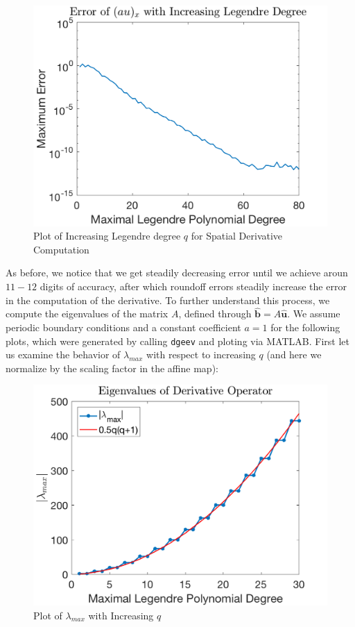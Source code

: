 \documentclass{article}
\begin{document}
\begin{figure}[H]
  \centering
  \includegraphics[scale=0.5]{plots/var_coeff.png}
  \caption{Plot of Increasing Legendre degree $q$ for Spatial Derivative Computation}
  \label{fig:spatDer}
\end{figure}
\noindent As before, we notice that we get steadily decreasing error until we achieve aroun $11-12$ digits of accuracy, after which roundoff errors steadily increase the error in the computation of the derivative. To further understand this process, we compute the eigenvalues of the matrix $A$, defined through $\boldsymbol{\hat{b}} = A \boldsymbol{\hat{u}}$. We assume periodic boundary conditions and a constant coefficient $a = 1$ for the following plots, which were generated by calling \verb|dgeev| and ploting via MATLAB. First let us examine the behavior of $\lambda _{max}$ with respect to increasing $q$ (and here we normalize by the scaling factor in the affine map):

\begin{figure}[H]
  \centering
  \includegraphics[scale=0.7]{plots/eig_data.png}
  \caption{Plot of $\lambda _{max}$ with Increasing $q$}
  \label{fig:eig_data}
\end{figure}
\end{document}
